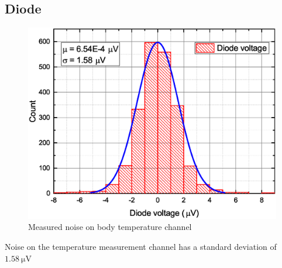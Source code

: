     \subsection{Diode}
        \begin{figure}[H]
            \centering
            \includegraphics[width=0.6\paperwidth]{img/07/diodeVoltage.eps}
            \caption{Measured noise on body temperature channel}
        \end{figure}

        Noise on the temperature measurement channel has a standard deviation of $\SI{1.58}{\uV}$
